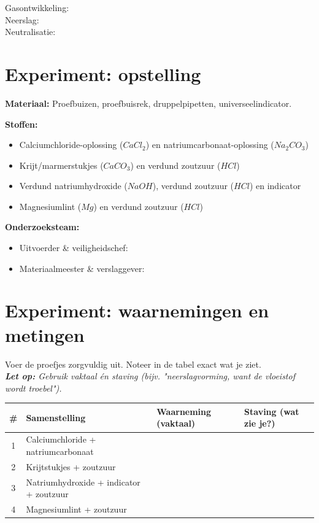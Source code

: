 \documentclass[a4paper, 11pt]{article}
\begin{document}
\vspace{0.3cm}
\noindent Gasontwikkeling: \dotfill \\
\vspace{0.3cm}
\noindent Neerslag: \dotfill \\
\vspace{0.3cm}
\noindent Neutralisatie: \dotfill 

\section{Experiment: opstelling}
\textbf{Materiaal:} Proefbuizen, proefbuisrek, druppelpipetten, universeelindicator.

\vspace{0.2cm}
\noindent \textbf{Stoffen:}
\begin{itemize}[label=--, noitemsep, leftmargin=1.5cm]
    \item Calciumchloride-oplossing ($CaCl_2$) en natriumcarbonaat-oplossing ($Na_2CO_3$)
    \item Krijt/marmerstukjes ($CaCO_3$) en verdund zoutzuur ($HCl$)
    \item Verdund natriumhydroxide ($NaOH$), verdund zoutzuur ($HCl$) en indicator
    \item Magnesiumlint ($Mg$) en verdund zoutzuur ($HCl$)
\end{itemize}

\vspace{0.3cm}
\noindent \textbf{Onderzoeksteam:}
\begin{itemize}[label=--, noitemsep, leftmargin=1.5cm]
    \item Uitvoerder \& veiligheidschef: \dotfill
    \item Materiaalmeester \& verslaggever: \dotfill
\end{itemize}

\section{Experiment: waarnemingen en metingen}
Voer de proefjes zorgvuldig uit. Noteer in de tabel exact wat je ziet. \\
\textit{\textbf{Let op:} Gebruik vaktaal én staving (bijv. "neerslagvorming, want de vloeistof wordt troebel").}

\vspace{0.6cm}
\renewcommand{\arraystretch}{2.2}
\begin{tabularx}{\textwidth}{|c|X|X|X|}
\hline
\rowcolor{gray!15} \textbf{\#} & \textbf{Samenstelling} & \textbf{Waarneming (vaktaal)} & \textbf{Staving (wat zie je?)} \\
\hline
1 & Calciumchloride + natriumcarbonaat & & \\
\hline
2 & Krijtstukjes + zoutzuur & & \\
\hline
3 & Natriumhydroxide + indicator + zoutzuur & & \\
\hline
4 & Magnesiumlint + zoutzuur & & \\
\hline
\end{tabularx}
\renewcommand{\arraystretch}{1}
\end{document}
